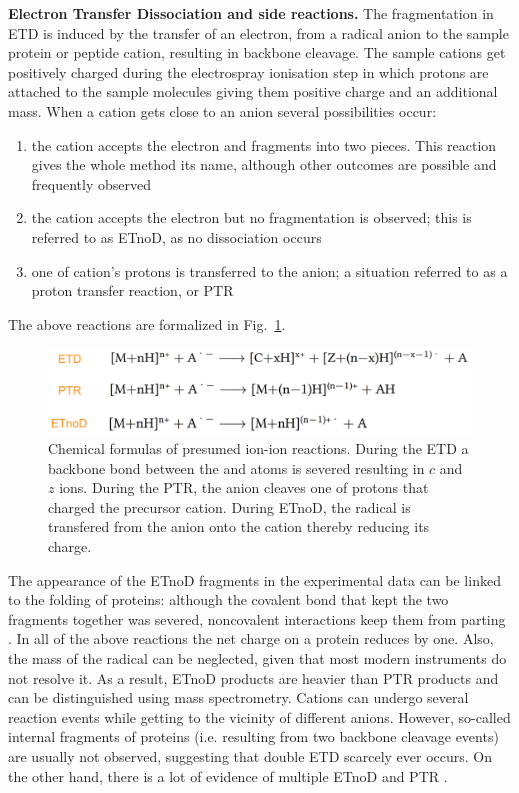 \documentclass{llncs}
\begin{document}
\textbf{Electron Transfer Dissociation and side reactions.}
        The fragmentation in ETD is induced by the transfer of an electron, from a radical anion to the sample protein or peptide cation, resulting in backbone  cleavage. The sample cations get positively charged during the electrospray ionisation step \cite{Fenn1989} in which protons are attached to the sample molecules giving them positive charge and an additional mass. When a cation gets close to an anion several possibilities occur:
        \begin{enumerate}
                \item the cation accepts the electron and fragments into two pieces. This reaction gives the whole method its name, although other outcomes are possible and frequently observed
                \item the cation accepts the electron but no fragmentation is observed; this is referred to as ETnoD, as no dissociation occurs
                \item one of cation’s protons is transferred to the anion; a situation referred to as a proton transfer reaction, or PTR
        \end{enumerate}
        The above reactions are formalized in Fig.~\ref{img::reactions}.
        \begin{figure}[h]
                \center
                \includegraphics[width=.8\textwidth]{reactions.png}
                \caption{Chemical formulas of presumed ion-ion reactions. During the ETD a backbone bond between the
                 and  atoms is severed resulting in $c$ and $z$ ions. During the PTR, the anion cleaves one of protons that charged the precursor cation. During ETnoD, the radical is transfered from the anion onto the cation thereby reducing its charge.}\label{img::reactions}
        \end{figure}

        The appearance of the ETnoD fragments in the experimental data can be linked to the folding of proteins: although the covalent bond that kept the two fragments together was severed, noncovalent interactions keep them from parting \cite{LermyteJASMS2014,Lermyte2016}. In all of the above reactions the net charge on a protein reduces by one. Also, the mass of the radical can be neglected, given that most modern instruments do not resolve it. As a result, ETnoD products are heavier than PTR products and can be distinguished using mass spectrometry. Cations can undergo several reaction events while getting to the vicinity of different anions. However, so-called internal fragments of proteins (i.e. resulting from two backbone cleavage events) are usually not observed, suggesting that double ETD scarcely ever occurs. On the other hand, there is a lot of evidence of multiple ETnoD and PTR \cite{LermyteJASMS2015}.
\end{document}
